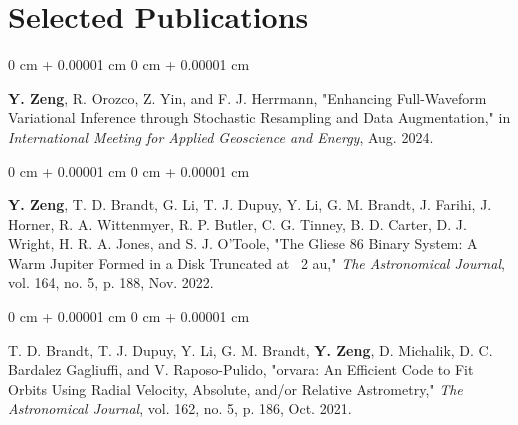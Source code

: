 \documentclass[10pt, letterpaper]{article}
\newenvironment{onecolentry}{
    \begin{adjustwidth}{
        0 cm + 0.00001 cm
    }{
        0 cm + 0.00001 cm
    }
}{
    \end{adjustwidth}
} %
\begin{document}
    
    \section{Selected Publications}



        

            

                

        \begin{samepage}
            \begin{onecolentry}
                \textbf{Y. Zeng}, R. Orozco, Z. Yin, and F. J. Herrmann, "Enhancing Full-Waveform Variational Inference through Stochastic Resampling and Data Augmentation," in \textit{International Meeting for Applied Geoscience and Energy}, Aug. 2024. 
            \end{onecolentry}
        \end{samepage}

        \begin{samepage}
            \begin{onecolentry}
                 \textbf{Y. Zeng}, T. D. Brandt, G. Li, T. J. Dupuy, Y. Li, G. M. Brandt, J. Farihi, J. Horner, R. A. Wittenmyer, R. P. Butler, C. G. Tinney, B. D. Carter, D. J. Wright, H. R. A. Jones, and S. J. O'Toole, "The Gliese 86 Binary System: A Warm Jupiter Formed in a Disk Truncated at ~2 au," \textit{The Astronomical Journal}, vol. 164, no. 5, p. 188, Nov. 2022.
            \end{onecolentry}
        \end{samepage}

        \begin{samepage}
            \begin{onecolentry}
                 T. D. Brandt, T. J. Dupuy, Y. Li, G. M. Brandt, \textbf{Y. Zeng}, D. Michalik, D. C. Bardalez Gagliuffi, and V. Raposo-Pulido, "orvara: An Efficient Code to Fit Orbits Using Radial Velocity, Absolute, and/or Relative Astrometry," \textit{The Astronomical Journal}, vol. 162, no. 5, p. 186, Oct. 2021.
            \end{onecolentry}
        \end{samepage}
\end{document}
